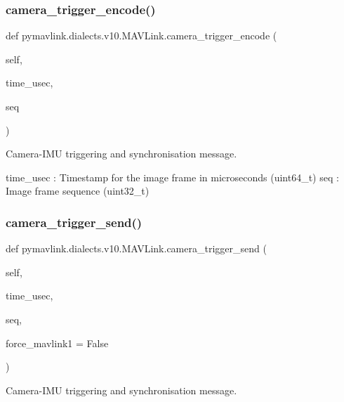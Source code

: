 \begin{DoxyVerb}
\begin{DoxyVerb}
\subsubsection{\texorpdfstring{camera\+\_\+trigger\+\_\+encode()}{camera\_trigger\_encode()}}
{\footnotesize\ttfamily def pymavlink.\+dialects.\+v10.\+M\+A\+V\+Link.\+camera\+\_\+trigger\+\_\+encode (\begin{DoxyParamCaption}\item[{}]{self,  }\item[{}]{time\+\_\+usec,  }\item[{}]{seq }\end{DoxyParamCaption})}

\begin{DoxyVerb}Camera-IMU triggering and synchronisation message.

time_usec                 : Timestamp for the image frame in microseconds (uint64_t)
seq                       : Image frame sequence (uint32_t)\end{DoxyVerb}
 \mbox{\label{classpymavlink_1_1dialects_1_1v10_1_1MAVLink_a0e841249b1bb3bb760759142f96fb489}} 
\subsubsection{\texorpdfstring{camera\+\_\+trigger\+\_\+send()}{camera\_trigger\_send()}}
{\footnotesize\ttfamily def pymavlink.\+dialects.\+v10.\+M\+A\+V\+Link.\+camera\+\_\+trigger\+\_\+send (\begin{DoxyParamCaption}\item[{}]{self,  }\item[{}]{time\+\_\+usec,  }\item[{}]{seq,  }\item[{}]{force\+\_\+mavlink1 = {\ttfamily False} }\end{DoxyParamCaption})}

\begin{DoxyVerb}Camera-IMU triggering and synchronisation message.


\end{DoxyVerb}
\end{DoxyVerb}
\end{DoxyVerb}
